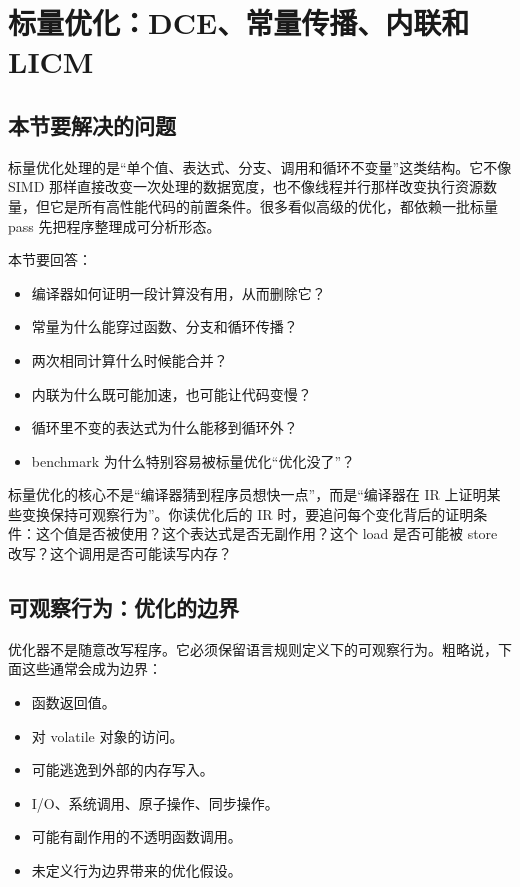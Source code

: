 \section{标量优化：DCE、常量传播、内联和 LICM}

\subsection{本节要解决的问题}

标量优化处理的是“单个值、表达式、分支、调用和循环不变量”这类结构。它不像 SIMD 那样直接改变一次处理的数据宽度，也不像线程并行那样改变执行资源数量，但它是所有高性能代码的前置条件。很多看似高级的优化，都依赖一批标量 pass 先把程序整理成可分析形态。

本节要回答：

\begin{itemize}
  \item 编译器如何证明一段计算没有用，从而删除它？
  \item 常量为什么能穿过函数、分支和循环传播？
  \item 两次相同计算什么时候能合并？
  \item 内联为什么既可能加速，也可能让代码变慢？
  \item 循环里不变的表达式为什么能移到循环外？
  \item benchmark 为什么特别容易被标量优化“优化没了”？
\end{itemize}

\begin{keyidea}
标量优化的核心不是“编译器猜到程序员想快一点”，而是“编译器在 IR 上证明某些变换保持可观察行为”。你读优化后的 IR 时，要追问每个变化背后的证明条件：这个值是否被使用？这个表达式是否无副作用？这个 load 是否可能被 store 改写？这个调用是否可能读写内存？
\end{keyidea}

\subsection{可观察行为：优化的边界}

优化器不是随意改写程序。它必须保留语言规则定义下的可观察行为。粗略说，下面这些通常会成为边界：

\begin{itemize}
  \item 函数返回值。
  \item 对 volatile 对象的访问。
  \item 可能逃逸到外部的内存写入。
  \item I/O、系统调用、原子操作、同步操作。
  \item 可能有副作用的不透明函数调用。
  \item 未定义行为边界带来的优化假设。
\end{itemize}


